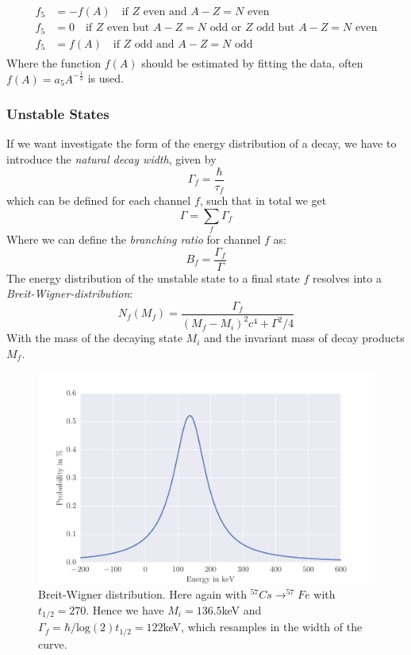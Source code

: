 \begin{itemize}
      \begin{align}
          \begin{split}
          \label{eq:pair}
          f_5 &= -f(A) \quad \text{if $Z$ even and $A-Z=N$ even}\\
          f_5 &=  0    \quad \text{if $Z$ even but $A-Z=N$ odd or $Z$ odd but $A-Z=N$ even}\\
          f_5 &=  f(A) \quad \text{if $Z$ odd and $A-Z=N$ odd}
          \end{split}
      \end{align}
      Where the function $f(A)$ should be estimated by fitting the data, 
      often $f(A) = a_5 A^{-\frac{1}{2}}$ is used.
\end{itemize}
\subsubsection{Unstable States}
\label{ssub:Unstable States}
If we want investigate the form of the energy distribution of a decay, we have to 
introduce the \textit{natural decay width}, given by
\begin{equation}
    \Gamma_f = \frac{\hbar}{\tau_f} 
\end{equation}
which can be defined for each channel $f$, such that in total we get
\begin{equation}
    \Gamma = \sum_{f} \Gamma_f
\end{equation}
Where we can define the \textit{branching ratio} for channel $f$ as:
\begin{equation}
    B_f = \frac{\Gamma_f}{\Gamma}
\end{equation}
The energy distribution of the unstable state to a final state $f$ resolves into a 
\textit{Breit-Wigner-distribution}:
\begin{equation}
    N_f(M_f) = \frac{\Gamma_f}{(M_f-M_i)^2 c^4 + \Gamma^2/4}
\end{equation}
With the mass of the decaying state $M_i$ and the invariant mass of decay products $M_f$.
\begin{figure}[htpb]
    \centering
    \includegraphics[width=0.9\linewidth]{analysis/figures/breit_wigner}
    \caption{Breit-Wigner distribution. Here again with
        $^{57}Cs\rightarrow ^{57}Fe$ with $t_{1/2}=270$. Hence we have $M_i = 136.5$keV and
    $\Gamma_f = \hbar / \textrm{log}(2)t_{1/2} = 122$keV, which resamples in the width of the curve.}
    \label{fig:name}
\end{figure}
\clearpage



